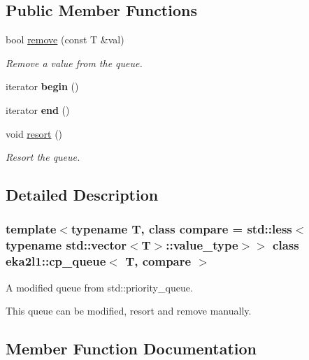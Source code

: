 \subsection*{Public Member Functions}
\begin{DoxyCompactItemize}
\item 
bool \mbox{\hyperlink{classeka2l1_1_1cp__queue_a51767f0b403e03febc3e4d4d5b432e5e}{remove}} (const T \&val)
\begin{DoxyCompactList}\small\item\em Remove a value from the queue. \end{DoxyCompactList}\item 
\mbox{\label{classeka2l1_1_1cp__queue_a380054a4d5a993e1fbd8377ad8f0d39e}} 
iterator {\bfseries begin} ()
\item 
\mbox{\label{classeka2l1_1_1cp__queue_aca67cedf2836bc842a59fb93810bbb67}} 
iterator {\bfseries end} ()
\item 
\mbox{\label{classeka2l1_1_1cp__queue_ab209a41bd70435e20db7b3b01d11315b}} 
void \mbox{\hyperlink{classeka2l1_1_1cp__queue_ab209a41bd70435e20db7b3b01d11315b}{resort}} ()
\begin{DoxyCompactList}\small\item\em Resort the queue. \end{DoxyCompactList}\end{DoxyCompactItemize}


\subsection{Detailed Description}
\subsubsection*{template$<$typename T, class compare = std\+::less$<$typename std\+::vector$<$\+T$>$\+::value\+\_\+type$>$$>$\newline
class eka2l1\+::cp\+\_\+queue$<$ T, compare $>$}

A modified queue from std\+::priority\+\_\+queue. 

This queue can be modified, resort and remove manually. 

\subsection{Member Function Documentation}
\mbox{\label{classeka2l1_1_1cp__queue_a51767f0b403e03febc3e4d4d5b432e5e}} 
